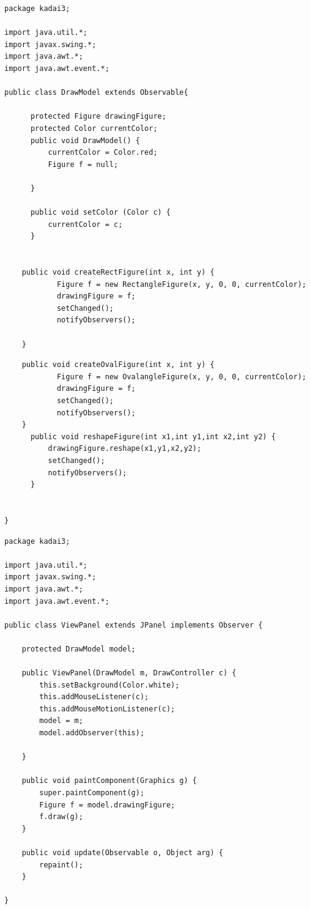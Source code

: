 \documentclass[12pt, a4paper, titlepage]{jsarticle}
\begin{document}
\begin{screen}
\begin{verbatim}
package kadai3;

import java.util.*;
import javax.swing.*;
import java.awt.*;
import java.awt.event.*;

public class DrawModel extends Observable{

	  protected Figure drawingFigure;
	  protected Color currentColor;
	  public void DrawModel() { 
		  currentColor = Color.red;
		  Figure f = null;
		 
	  }
	  
	  public void setColor (Color c) {
		  currentColor = c; 
	  }
	  
	
	public void createRectFigure(int x, int y) {
			Figure f = new RectangleFigure(x, y, 0, 0, currentColor);
			drawingFigure = f;
			setChanged();
			notifyObservers();
		
	}
\end{verbatim}
\end{screen}
\begin{screen}
\begin{verbatim}
	public void createOvalFigure(int x, int y) {
			Figure f = new OvalangleFigure(x, y, 0, 0, currentColor);
			drawingFigure = f;
			setChanged();
			notifyObservers();
	}
	  public void reshapeFigure(int x1,int y1,int x2,int y2) {
	      drawingFigure.reshape(x1,y1,x2,y2);
	      setChanged();
	      notifyObservers();
	  }
	
	
}

\end{verbatim}
\end{screen}
\begin{screen}
\begin{verbatim}
package kadai3;

import java.util.*;
import javax.swing.*;
import java.awt.*;
import java.awt.event.*;

public class ViewPanel extends JPanel implements Observer {

	protected DrawModel model;

	public ViewPanel(DrawModel m, DrawController c) {
		this.setBackground(Color.white);
		this.addMouseListener(c);
		this.addMouseMotionListener(c);
		model = m;
		model.addObserver(this);
		
	}

	public void paintComponent(Graphics g) {
		super.paintComponent(g);
		Figure f = model.drawingFigure;
		f.draw(g);
	}

	public void update(Observable o, Object arg) {
		repaint();
	}

}

\end{verbatim}
\end{screen}
\end{document}
